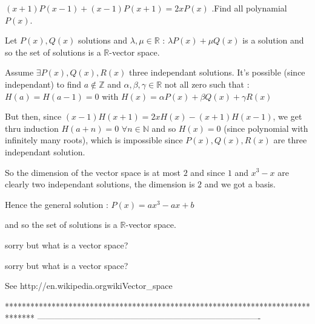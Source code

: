 \begin{solution}
	\begin{tcolorbox}$ (x + 1)P(x - 1) + (x - 1)P(x + 1) = 2xP(x)$ .Find all polynamial $ P(x)$.\end{tcolorbox}

Let $ P(x),Q(x)$ solutions and $ \lambda,\mu\in\mathbb R$ : $ \lambda P(x)+\mu Q(x)$ is a solution and so the set of solutions is a $ \mathbb R$-vector space.

Assume $ \exists P(x),Q(x),R(x)$ three independant solutions. It's possible (since independant) to find $ a\notin\mathbb Z$ and $ \alpha,\beta,\gamma\in\mathbb R$ not all zero such that :
$ H(a)=H(a-1)=0$ with $ H(x)=\alpha P(x)+\beta Q(x) +\gamma R(x)$

But then, since $ (x-1)H(x+1)=2xH(x)-(x+1)H(x-1)$, we get thru induction $ H(a+n)=0$ $ \forall n\in\mathbb N$ and so $ H(x)=0$ (since polynomial with infinitely many roots), which is impossible since $ P(x),Q(x),R(x)$ are three independant solution.

So the dimension of the vector space is at most $ 2$ and since $ 1$ and $ x^3-x$ are clearly two independant solutions, the dimension is $ 2$ and we got a basis.

Hence the general solution : $ \boxed{P(x)=ax^3-ax+b}$
\end{solution}



\begin{solution}
	\begin{tcolorbox}and so the set of solutions is a $ \mathbb{R}$-vector space. \end{tcolorbox}
sorry but what is a vector space?
\end{solution}



\begin{solution}
	\begin{tcolorbox} sorry but what is a vector space?\end{tcolorbox}

See http://en.wikipedia.org\/wiki\/Vector_space
\end{solution}
*******************************************************************************
-------------------------------------------------------------------------------

